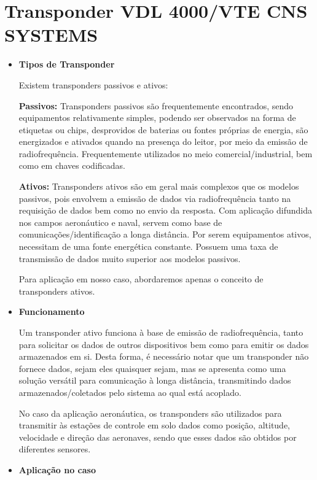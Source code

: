 \chapter[Transponder VDL 4000/VTE CNS SYSTEMS]{Transponder VDL 4000/VTE CNS SYSTEMS}

\begin{itemize}

\item \textbf{Tipos de Transponder}

Existem transponders passivos e ativos:

\textbf{Passivos:} Transponders passivos são frequentemente encontrados, sendo equipamentos relativamente simples, podendo ser observados na forma de etiquetas ou chips, desprovidos de baterias ou fontes próprias de energia, são energizados e ativados quando na presença do leitor, por meio da emissão de radiofrequência. Frequentemente utilizados no meio comercial/industrial, bem como em chaves codificadas.

\textbf{Ativos:} Transponders ativos são em geral mais complexos que os modelos passivos, pois envolvem a emissão de dados via radiofrequência tanto na requisição de dados bem como no envio da resposta. Com aplicação difundida nos campos aeronáutico e naval, servem como base de comunicações/identificação a longa distância. Por serem equipamentos ativos, necessitam de uma fonte energética constante. Possuem uma taxa de transmissão de dados muito superior aos modelos passivos.

Para aplicação em nosso caso, abordaremos apenas o conceito de transponders ativos.

\item \textbf{Funcionamento}

Um transponder ativo funciona à base de emissão de radiofrequência, tanto para solicitar os dados de outros dispositivos bem como para emitir os dados armazenados em si. Desta forma, é necessário notar que um transponder não fornece dados, sejam eles quaisquer sejam, mas se apresenta como uma solução versátil para comunicação à longa distância, transmitindo dados armazenados/coletados pelo sistema ao qual está acoplado.

No caso da aplicação aeronáutica, os transponders são utilizados para transmitir às estações de controle em solo dados como posição, altitude, velocidade e direção das aeronaves, sendo que esses dados são obtidos por diferentes sensores.
	
\item \textbf{Aplicação no caso}


\end{itemize}
